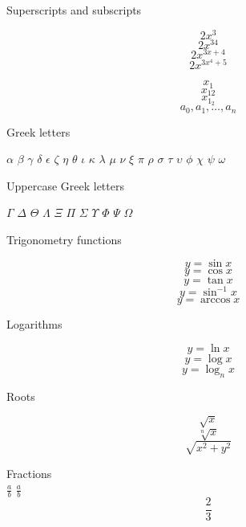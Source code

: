 \documentclass{article}
\begin{document}
Superscripts and subscripts

$$2x^3$$
$$2x^{34}$$
$$2x^{3x+4}$$
$$2x^{3x^4+5}$$

$$x_1$$
$$x_{12}$$
$$x_{1_2}$$
$$a_0, a_1, \ldots, a_n$$

Greek letters

$\alpha$
$\beta$
$\gamma$
$\delta$
$\epsilon$
$\zeta$
$\eta$
$\theta$
$\iota$
$\kappa$
$\lambda$
$\mu$
$\nu$
$\xi$
$\pi$
$\rho$
$\sigma$
$\tau$
$\upsilon$
$\phi$
$\chi$
$\psi$
$\omega$

Uppercase Greek letters

$\Gamma$
$\Delta$
$\Theta$
$\Lambda$
$\Xi$
$\Pi$
$\Sigma$
$\Upsilon$
$\Phi$
$\Psi$
$\Omega$

Trigonometry functions

$$y = \sin x$$
$$y = \cos x$$
$$y = \tan x$$
$$y = \sin^{-1} x$$
$$y = \arccos x$$

Logarithms

$$y = \ln x$$
$$y = \log x$$
$$y = \log_{n} x$$

Roots

$$\sqrt{x}$$
$$\sqrt[n]{x}$$
$$\sqrt{x^2+y^2}$$

Fractions\\

$\frac{a}{b}$
$\displaystyle\frac{a}{b}$
$$\frac{2}{3}$$
\end{document}
